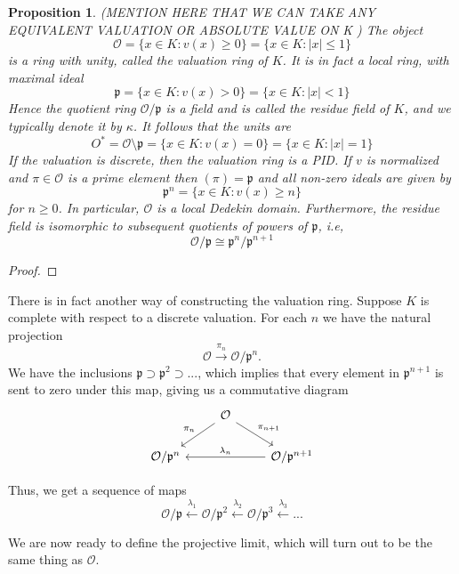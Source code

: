\documentclass{article}
\newtheorem{proposition}{Proposition}[section]
\newcommand{\mfrak}[1]{\mathfrak{#1}}
\newcommand{\mcal}[1]{\mathcal{#1}}
\begin{document}
\begin{proposition}
    (MENTION HERE THAT WE CAN TAKE ANY EQUIVALENT VALUATION OR ABSOLUTE VALUE ON K  )
    The object
    $$\mcal O = \{x \in K :  v(x) \geq 0 \} = \{x \in K : |x| \leq 1 \}$$ 
    is a ring with unity, called the valuation ring of $K$. It is in fact a local ring, with maximal ideal 
    $$\mfrak p = \{x \in K : v(x) > 0 \} = \{x \in K : |x| < 1 \}$$
    Hence the quotient ring $\mcal O / \mfrak p$ is a field and is called the residue field of $K$, and we typically denote it by $\kappa$. It follows that the units are 
    $$O^* = \mcal O \setminus \mfrak p = \{x \in K : v(x) = 0 \} = \{x \in K : |x| = 1 \}$$
    If the valuation is discrete, then the valuation ring is a PID. If $v$ is normalized and $\pi \in \mcal O$ is a prime element then $(\pi) = \mfrak{p}$ and all non-zero ideals are given by
    $$\mfrak p^n = \{x \in K : v(x) \geq n \}$$
    for $n \geq 0$. In particular, $\mcal O$ is a local Dedekin domain. Furthermore, the residue field is isomorphic to subsequent quotients of powers of $\mfrak p$, i.e,
    $$\mcal O / \mfrak p \cong \mfrak p^n / \mfrak p^{n+1}$$
\end{proposition}

\begin{proof}
    
\end{proof}
There is in fact another way of constructing the valuation ring. Suppose $K$ is complete with respect to a discrete valuation. For each $n$ we have the natural projection 
$$\mcal O \xrightarrow{\pi_n} \mcal O / \mfrak p^n.$$ 
We have the inclusions $\mfrak p \supset \mfrak p^2 \supset ...$, which implies that every element in $\mfrak p^{n+1}$ is sent to zero under this map, giving us a commutative diagram
$$\begin{tikzcd}
    & \mcal O \arrow[ld, "\pi_{n}"'] \arrow[rd, "\pi_{n+1}"] & \\
    \mcal O / \mfrak p^{n} & & \mcal O / \mfrak p^{n+1} \arrow[ll, "\lambda_{n}"']
\end{tikzcd}$$


Thus, we get a sequence of maps 
$$\mcal O / \mfrak p \xleftarrow {\lambda_1} \mcal O / \mfrak p^2 \xleftarrow {\lambda_2} \mcal O / \mfrak p^3 \xleftarrow {\lambda_3} ...$$

We are now ready to define the projective limit, which will turn out to be the same thing as $\mcal O$.
\end{document}
